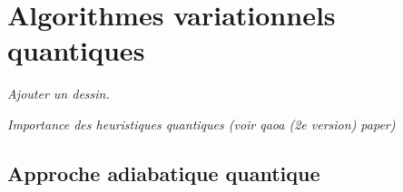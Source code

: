 \chapter{Algorithmes variationnels quantiques}

\textcolor{mydarkred}{\textit{Ajouter un dessin.}}

\textcolor{mydarkred}{\textit{Importance des heuristiques quantiques (voir qaoa (2e version) paper)}}


\section{Approche adiabatique quantique}

